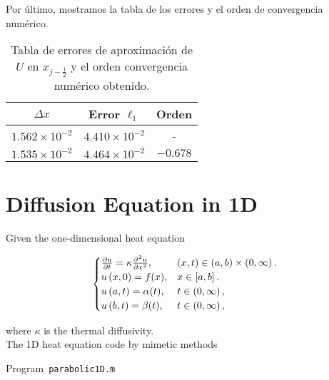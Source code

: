 Por último, mostramos la tabla de los errores y el orden de convergencia numérico.

\begin{table}[ht!]
	\centering
	\begin{tabular}{ccc}
		\toprule
		$\Delta x$            & Error $\ell_1$        & Orden    \\
		\midrule
		$1.562\times 10^{-2}$ & $4.410\times 10^{-2}$ & -        \\
		$1.535\times 10^{-2}$ & $4.464\times 10^{-2}$ & $-0.678$ \\
		\bottomrule
	\end{tabular}
	\caption{Tabla de errores de aproximación de $U$ en
		$x_{j-\frac{1}{2}}$ y el orden convergencia numérico obtenido.}
	\label{table:errors}
\end{table}


\section{Diffusion Equation in 1D}

Given the one-dimensional heat equation

\begin{equation}\label{eq:IBVPheat1d}
	\begin{cases}
		\diffp{u}{t}=
		\kappa\diffp[2]{u}{x},
		                              & \left(x,t\right)\in
		\left(a,b \right)\times\left(0, \infty \right).     \\
		u\left(x,0\right)=f(x),
		                              & x\in
		\left[a,b\right].                                   \\
		u\left(a,t\right)= \alpha(t), & t\in
		\left(0,\infty\right),                              \\
		u\left(b,t\right)= \beta(t),
		                              & t\in
		\left(0,\infty\right),
	\end{cases}
\end{equation}

where $\kappa$ is the thermal diffusivity.\\

The 1D heat equation code by mimetic methods

\begin{octavelisting}
	\tiny
	\centering
	\caption{Program~\texttt{parabolic1D.m}}
	\label{code:parabolic1D.m}
\end{octavelisting}


